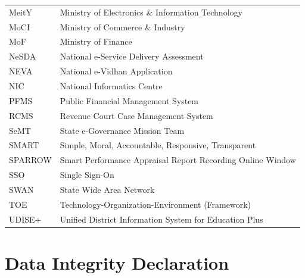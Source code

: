 \documentclass[12pt,a4paper]{article}
\begin{document}
\begin{longtable}{@{}ll@{}}
MeitY & Ministry of Electronics \& Information Technology \\
MoCI & Ministry of Commerce \& Industry \\
MoF & Ministry of Finance \\
NeSDA & National e-Service Delivery Assessment \\
NEVA & National e-Vidhan Application \\
NIC & National Informatics Centre \\
PFMS & Public Financial Management System \\
RCMS & Revenue Court Case Management System \\
SeMT & State e-Governance Mission Team \\
SMART & Simple, Moral, Accountable, Responsive, Transparent \\
SPARROW & Smart Performance Appraisal Report Recording Online Window \\
SSO & Single Sign-On \\
SWAN & State Wide Area Network \\
TOE & Technology-Organization-Environment (Framework) \\
UDISE+ & Unified District Information System for Education Plus \\
\bottomrule
\end{longtable}

\section*{Data Integrity Declaration}
\end{document}
